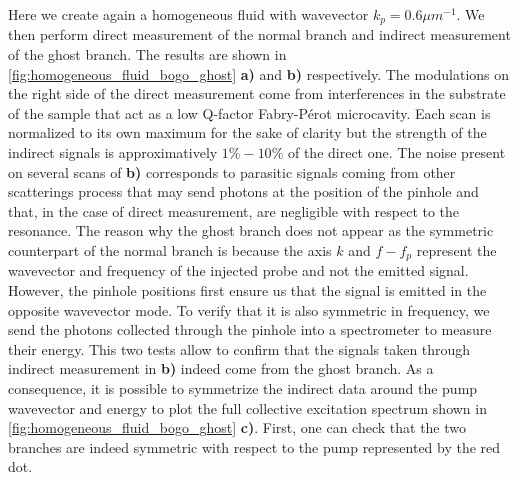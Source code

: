 Here we create again a homogeneous fluid with wavevector $k_p =0.6 \mu m^{-1}$. We then 
perform direct measurement of the normal branch and indirect measurement of the ghost branch. The results are shown in \autoref{fig:homogeneous_fluid_bogo_ghost} \textbf{a)} and \textbf{b)} respectively.  The modulations on the right side of the direct measurement come from interferences in the substrate of the sample
that act as a low Q-factor Fabry-Pérot \cite{claude_phd} microcavity. Each scan is normalized to its own maximum for the sake of clarity but 
the strength of the indirect signals is approximatively $1\%-10\%$ of the direct one. The noise present on several scans of \textbf{b)} corresponds to parasitic signals coming from other scatterings process that may send photons at the position of the pinhole and that, in the case of direct measurement, are negligible with respect to the resonance. The reason why the ghost branch does not appear as the symmetric counterpart of the normal branch 
is because the axis $k$ and $f-f_p$ represent the wavevector and frequency of the injected probe and not the emitted signal. However, the pinhole positions first ensure us that the signal is emitted in the opposite wavevector mode. To verify that it is also symmetric in frequency, we send the photons collected through the pinhole 
into a spectrometer to measure their energy. This two tests allow to confirm that the signals taken through indirect measurement in \textbf{b)} indeed come from the ghost branch. As a consequence, it is possible  to symmetrize the indirect data around the pump wavevector and energy to plot the full collective excitation spectrum shown in \autoref{fig:homogeneous_fluid_bogo_ghost} \textbf{c)}. First, one can check that the two branches 
are indeed symmetric with respect to the pump represented by the red dot.
